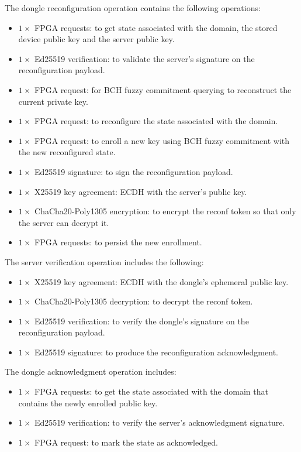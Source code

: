 The dongle reconfiguration operation contains the following operations:
\begin{itemize}
    \item $1\times$ FPGA requests: to get state associated with the domain, the stored device public key and the server public key.
    \item $1\times$ Ed25519 verification: to validate the server's signature on the reconfiguration payload.
    \item $1\times$ FPGA request: for BCH fuzzy commitment querying to reconstruct the current private key.
    \item $1\times$ FPGA request: to reconfigure the state associated with the domain.
    \item $1\times$ FPGA request: to enroll a new key using BCH fuzzy commitment with the new reconfigured state.
    \item $1\times$ Ed25519 signature: to sign the reconfiguration payload.
    \item $1\times$ X25519 key agreement: ECDH with the server's public key.
    \item $1\times$ ChaCha20-Poly1305 encryption: to encrypt the reconf token so that only the server can decrypt it.
    \item $1\times$ FPGA requests: to persist the new enrollment.
\end{itemize}

The server verification operation includes the following:
\begin{itemize} 
    \item $1\times$ X25519 key agreement: ECDH with the dongle's ephemeral public key.
    \item $1\times$ ChaCha20-Poly1305 decryption: to decrypt the reconf token.
    \item $1\times$ Ed25519 verification: to verify the dongle's signature on the reconfiguration payload.
    \item $1\times$ Ed25519 signature: to produce the reconfiguration acknowledgment. 
\end{itemize}

The dongle acknowledgment operation includes:
\begin{itemize}
    \item $1\times$ FPGA requests: to get the state associated with the domain that contains the newly enrolled public key.
    \item $1\times$ Ed25519 verification: to verify the server's acknowledgment signature.
    \item $1\times$ FPGA request: to mark the state as acknowledged. 
\end{itemize}

